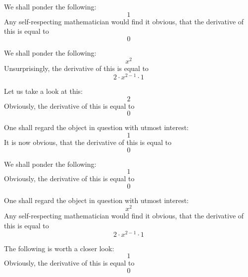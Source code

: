 \documentclass{article}
\begin{document}
We shall ponder the following:
\begin{equation}
1 
\end{equation}
Any self-respecting mathematician would find it obvious, that the derivative of this is equal to
\begin{equation}
0 
\end{equation}

We shall ponder the following:
\begin{equation}
x ^{2 } 
\end{equation}
Unsurprisingly, the derivative of this is equal to
\begin{equation}
2 \cdot x ^{2 - 1 } \cdot 1 
\end{equation}

Let us take a look at this:
\begin{equation}
2 
\end{equation}
Obviously, the derivative of this is equal to
\begin{equation}
0 
\end{equation}

One shall regard the object in question with utmost interest:
\begin{equation}
1 
\end{equation}
It is now obvious, that the derivative of this is equal to
\begin{equation}
0 
\end{equation}

We shall ponder the following:
\begin{equation}
1 
\end{equation}
Obviously, the derivative of this is equal to
\begin{equation}
0 
\end{equation}

One shall regard the object in question with utmost interest:
\begin{equation}
x ^{2 } 
\end{equation}
Any self-respecting mathematician would find it obvious, that the derivative of this is equal to
\begin{equation}
2 \cdot x ^{2 - 1 } \cdot 1 
\end{equation}

The following is worth a closer look:
\begin{equation}
1 
\end{equation}
Obviously, the derivative of this is equal to
\begin{equation}
0 
\end{equation}
\end{document}
